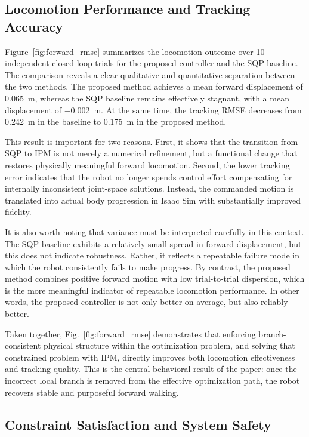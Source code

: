 \subsection{Locomotion Performance and Tracking Accuracy}

Figure~\ref{fig:forward_rmse} summarizes the locomotion outcome over 10 independent closed-loop trials for the proposed controller and the SQP baseline. The comparison reveals a clear qualitative and quantitative separation between the two methods. The proposed method achieves a mean forward displacement of 0.065~m, whereas the SQP baseline remains effectively stagnant, with a mean displacement of $-0.002$~m. At the same time, the tracking RMSE decreases from 0.242~m in the baseline to 0.175~m in the proposed method.

This result is important for two reasons. First, it shows that the transition from SQP to IPM is not merely a numerical refinement, but a functional change that restores physically meaningful forward locomotion. Second, the lower tracking error indicates that the robot no longer spends control effort compensating for internally inconsistent joint-space solutions. Instead, the commanded motion is translated into actual body progression in Isaac Sim with substantially improved fidelity.

It is also worth noting that variance must be interpreted carefully in this context. The SQP baseline exhibits a relatively small spread in forward displacement, but this does not indicate robustness. Rather, it reflects a repeatable failure mode in which the robot consistently fails to make progress. By contrast, the proposed method combines positive forward motion with low trial-to-trial dispersion, which is the more meaningful indicator of repeatable locomotion performance. In other words, the proposed controller is not only better on average, but also reliably better.

Taken together, Fig.~\ref{fig:forward_rmse} demonstrates that enforcing branch-consistent physical structure within the optimization problem, and solving that constrained problem with IPM, directly improves both locomotion effectiveness and tracking quality. This is the central behavioral result of the paper: once the incorrect local branch is removed from the effective optimization path, the robot recovers stable and purposeful forward walking.

\subsection{Constraint Satisfaction and System Safety}

